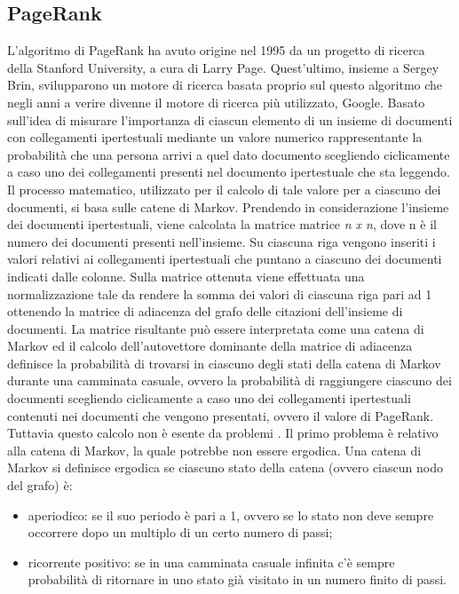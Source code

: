 \subsection{PageRank}
L'algoritmo di PageRank \cite{cit_45} ha avuto origine nel 1995 da un progetto di ricerca
della Stanford University, a cura di Larry Page. Quest'ultimo, insieme a Sergey Brin,
svilupparono un motore di ricerca basata proprio sul questo algoritmo che negli anni a verire
divenne il motore di ricerca pi\`u utilizzato, Google. Basato sull'idea di misurare
l'importanza di ciascun elemento di un insieme di documenti con collegamenti ipertestuali
mediante un valore numerico rappresentante la probabilit\`a che una persona arrivi
a quel dato documento scegliendo ciclicamente a caso uno dei collegamenti presenti
nel documento ipertestuale che sta leggendo. Il processo matematico, utilizzato per
il calcolo di tale valore per a ciascuno dei documenti, si basa sulle catene di Markov.
Prendendo in considerazione l'insieme dei documenti ipertestuali, viene calcolata la matrice
matrice \textit{n x n}, dove n \`e il numero dei documenti presenti nell'insieme.
Su ciascuna riga vengono inseriti i valori relativi ai collegamenti ipertestuali
che puntano a ciascuno dei documenti indicati dalle colonne. Sulla matrice ottenuta viene
effettuata una normalizzazione tale da rendere la somma dei valori di ciascuna riga pari ad 1
ottenendo la matrice di adiacenza del grafo delle citazioni dell'insieme di documenti.
La matrice risultante pu\`o essere interpretata come una catena di Markov ed il calcolo
dell'autovettore dominante della matrice di adiacenza definisce la probabilit\`a di
trovarsi in ciascuno degli stati della catena di Markov durante una camminata casuale,
ovvero la probabilit\`a di raggiungere ciascuno dei documenti scegliendo ciclicamente
a caso uno dei collegamenti ipertestuali contenuti nei documenti che vengono presentati,
ovvero il valore di PageRank.\\
Tuttavia questo calcolo non \`e esente da problemi \cite{cit_50}.
Il primo problema \`e relativo alla catena di Markov, la quale potrebbe non essere ergodica.
Una catena di Markov si definisce ergodica se ciascuno stato della catena (ovvero ciascun nodo del grafo) \`e:
\begin{itemize}
\item aperiodico: se il suo periodo \`e pari a 1, ovvero se lo stato non deve sempre
occorrere dopo un multiplo di un certo numero di passi;
\item ricorrente positivo: se in una camminata casuale infinita c'\`e sempre
probabilit\`a di ritornare in uno stato gi\`a visitato in un numero finito
di passi.
\end{itemize}
